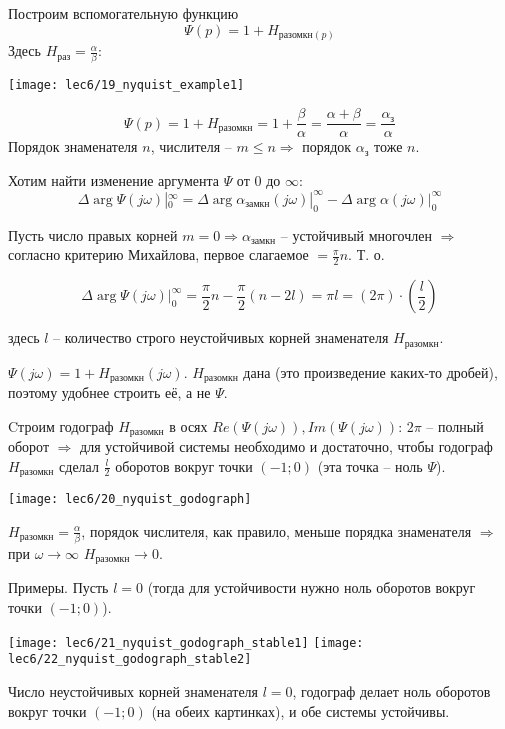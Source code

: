 \documentclass[main.tex]{subfiles}
\begin{document}
Построим вспомогательную функцию
$$ \Psi(p) = 1 + H_{\text{разомкн}(p)} $$
Здесь $ H_{\text{раз}}=\frac{\alpha}{\beta} $:

\texttt{[image: lec6/19\_nyquist\_example1]}

$$ \Psi(p) = 1 + H_{\text{разомкн}} = 1 + \frac{\beta}{\alpha} = \frac{\alpha + \beta}{\alpha} = \frac{\alpha_{\text{з}}}{\alpha} $$
Порядок знаменателя $n$, числителя -- $ m \le n \Rightarrow $ порядок $ \alpha_{\text{з}} $ тоже $ n $.

Хотим найти изменение аргумента $ \Psi $ от $ 0 $ до $ \infty $:
$$ \Delta \arg \Psi(j\omega) |_0^\infty = \Delta  \arg \alpha_{\text{замкн}}(j\omega)|_0^\infty - \Delta  \arg \alpha(j\omega)|_0^\infty $$

Пусть число правых корней $ m=0 \Rightarrow \alpha_{\text{замкн}} $ -- устойчивый многочлен $ \Rightarrow $ согласно критерию Михайлова, первое слагаемое $ = \frac{\pi}{2} n $. Т. о.

$$ \Delta \arg \Psi(j\omega) |_0^\infty = \frac{\pi}{2} n - \frac{\pi}{2} (n - 2l) = \pi l = (2 \pi) \cdot \left( \frac{l}{2}\right)  $$

здесь $ l $ -- количество строго неустойчивых корней знаменателя $ H_{\text{разомкн}} $.

$ \Psi(j \omega) = 1 + H_{\text{разомкн}} (j \omega) $.
$ H_{\text{разомкн}} $ дана (это произведение каких-то дробей), поэтому удобнее строить её, а не $ \Psi $.

Cтроим годограф $ H_{\text{разомкн}} $ в осях $ Re( \Psi(j \omega) ), Im( \Psi(j \omega)) $:
$ 2 \pi $ -- полный оборот $ \Rightarrow $ для устойчивой системы необходимо и достаточно, чтобы годограф $ H_{\text{разомкн}} $ сделал $ \frac{l}{2} $ оборотов вокруг точки $ (-1;0) $ (эта точка -- ноль $ \Psi $).

\texttt{[image: lec6/20\_nyquist\_godograph]}

$ H_{\text{разомкн}} = \frac{\alpha}{\beta} $, порядок числителя, как правило, меньше порядка знаменателя $ \Rightarrow $ при $ \omega \to \infty $ $ H_{\text{разомкн}} \to 0 $.


Примеры.
Пусть $ l = 0 $ (тогда для устойчивости нужно ноль оборотов вокруг точки $ (-1;0) $).

\texttt{[image: lec6/21\_nyquist\_godograph\_stable1]}
\texttt{[image: lec6/22\_nyquist\_godograph\_stable2]}

Число неустойчивых корней знаменателя $ l = 0 $, годограф делает ноль оборотов вокруг точки $ (-1;0) $ (на обеих картинках), и обе системы устойчивы.
\end{document}
